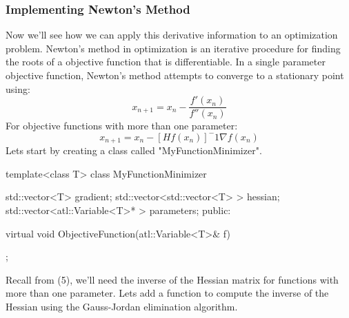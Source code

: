 \documentclass[12pt,a4paper]{article}
\begin{document}
\subsubsection{Implementing Newton's Method}
Now we'll see how we can apply this derivative information to an optimization problem. Newton's method in optimization is an iterative procedure for finding the roots of a objective function that is differentiable. In a single parameter objective function, Newton's method attempts to converge to a stationary point using:
 \begin{equation}
x_{n+1} = x_n - \frac{f'(x_n)}{f''(x_n)}
 \end{equation}
 For objective functions with more than one parameter:
  \begin{equation}
x_{n+1} = x_n - [Hf(x_n)]^-1 \nabla f(x_n)
 \end{equation}
Lets start by creating a class called "MyFunctionMinimizer".\\
\begin{cppsource}
 template<class T>
    class MyFunctionMinimizer {
        std::vector<T> gradient;
        std::vector<std::vector<T> > hessian;
        std::vector<atl::Variable<T>* > parameters;
    public:

        virtual void ObjectiveFunction(atl::Variable<T>& f) {

        }
    };
\end{cppsource}
Recall from (5), we'll need the inverse of the Hessian matrix for functions with more than one parameter. Lets add a function to compute the inverse of the Hessian using the Gauss-Jordan elimination algorithm.\\
\end{document}
